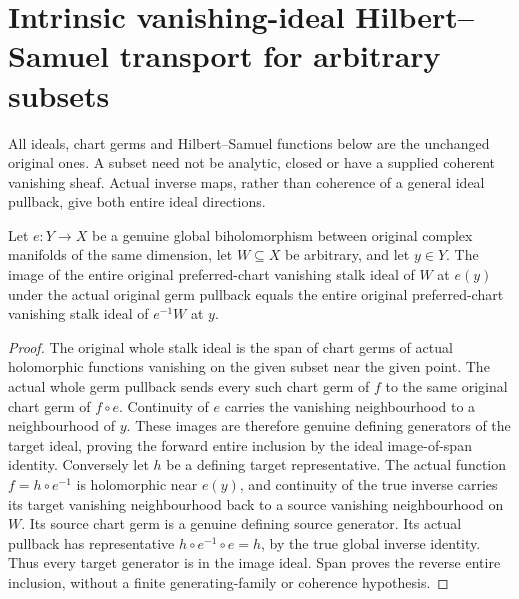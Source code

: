 \section{Intrinsic vanishing-ideal Hilbert--Samuel transport for arbitrary subsets}

All ideals, chart germs and Hilbert--Samuel functions below are the
unchanged original ones. A subset need not be analytic, closed or have
a supplied coherent vanishing sheaf. Actual inverse maps, rather than
coherence of a general ideal pullback, give both entire ideal directions.

\begin{theorem}
\label{hir:actual-any-subset-biholomorphic-whole-vanishing-ideal}
\leanok
Let $e:Y\to X$ be a genuine global biholomorphism between original
complex manifolds of the same dimension, let $W\subseteq X$ be arbitrary,
and let $y\in Y$. The image of the entire original preferred-chart
vanishing stalk ideal of $W$ at $e(y)$ under the actual original germ
pullback equals the entire original preferred-chart vanishing stalk
ideal of $e^{-1}W$ at $y$.
\end{theorem}
\begin{proof}
The original whole stalk ideal is the span of chart germs of actual
holomorphic functions vanishing on the given subset near the given point.
The actual whole germ pullback sends every such chart germ of $f$ to the
same original chart germ of $f\circ e$. Continuity of $e$ carries the
vanishing neighbourhood to a neighbourhood of $y$. These images are
therefore genuine defining generators of the target ideal, proving the
forward entire inclusion by the ideal image-of-span identity.
Conversely let $h$ be a defining target representative. The actual
function $f=h\circ e^{-1}$ is holomorphic near $e(y)$, and continuity of
the true inverse carries its target vanishing neighbourhood back to a
source vanishing neighbourhood on $W$. Its source chart germ is a
genuine defining source generator. Its actual pullback has representative
$h\circ e^{-1}\circ e=h$, by the true global inverse identity. Thus every
target generator is in the image ideal. Span proves the reverse entire
inclusion, without a finite generating-family or coherence hypothesis.
\end{proof}

